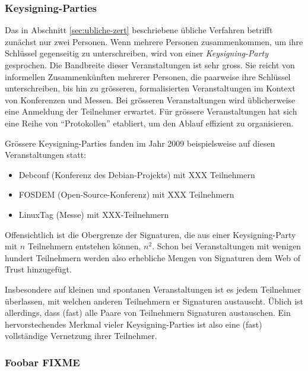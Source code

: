 \subsubsection{Keysigning-Parties}
\label{sec:keysigning-parties}

Das in Abschnitt \ref{sec:ubliche-zert} beschriebene \"ubliche
Verfahren betrifft zun\"achst nur zwei Personen. Wenn mehrere Personen
zusammenkommen, um ihre Schl\"ussel gegenseitig zu unterschreiben,
wird von einer \emph{Keysigning-Party} gesprochen. Die Bandbreite
dieser Veranstaltungen ist sehr gross. Sie reicht von informellen
Zusammenk\"unften mehrerer Personen, die paarweise ihre Schl\"ussel
unterschreiben, bis hin zu gr\"osseren, formalisierten Veranstaltungen
im Kontext von Konferenzen und Messen. Bei gr\"osseren Veranstaltungen
wird \"ublicherweise eine Anmeldung der Teilnehmer erwartet. F\"ur
gr\"ossere Veranstaltungen hat sich eine Reihe von ``Protokollen''
etabliert, um den Ablauf effizient zu organisieren\cite{Brennen2008}.

Gr\"ossere Keysigning-Parties fanden im Jahr 2009 beispielsweise auf
diesen Veranstaltungen statt:
\begin{itemize}
\item Debconf (Konferenz des Debian-Projekts) mit XXX Teilnehmern
\item FOSDEM (Open-Source-Konferenz) mit XXX Teilnehmern
\item LinuxTag (Messe) mit XXX-Teilnehmern
\end{itemize}

Offensichtlich ist die Obergrenze der Signaturen, die aus einer
Keysigning-Party mit $n$ Teilnehmern entstehen k\"onnen, $n^2$. Schon
bei Veranstaltungen mit wenigen hundert Teilnehmern werden also
erhebliche Mengen von Signaturen dem Web of Trust hinzugef\"ugt.

Insbesondere auf kleinen und spontanen Veranstaltungen ist es jedem
Teilnehmer \"uberlassen, mit welchen anderen Teilnehmern er Signaturen
austauscht. \"Ublich ist allerdings, dass (fast) alle Paare von
Teilnehmern Signaturen austauschen. Ein hervorstechendes Merkmal
vieler Keysigning-Parties ist also eine (fast) vollst\"andige
Vernetzung ihrer Teilnehmer.


\subsubsection{Foobar FIXME}
\label{sec:foobar-fixme}

